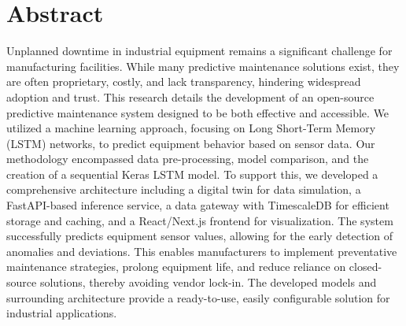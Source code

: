 \chapter{Abstract}
\begin{SingleSpace}
Unplanned downtime in industrial equipment remains a significant challenge for manufacturing facilities. While many predictive maintenance solutions exist, they are often proprietary, costly, and lack transparency, hindering widespread adoption and trust. This research details the development of an open-source predictive maintenance system designed to be both effective and accessible. We utilized a machine learning approach, focusing on Long Short-Term Memory (LSTM) networks, to predict equipment behavior based on sensor data. Our methodology encompassed data pre-processing, model comparison, and the creation of a sequential Keras LSTM model. To support this, we developed a comprehensive architecture including a digital twin for data simulation, a FastAPI-based inference service, a data gateway with TimescaleDB for efficient storage and caching, and a React/Next.js frontend for visualization. The system successfully predicts equipment sensor values, allowing for the early detection of anomalies and deviations. This enables manufacturers to implement preventative maintenance strategies, prolong equipment life, and reduce reliance on closed-source solutions, thereby avoiding vendor lock-in. The developed models and surrounding architecture provide a ready-to-use, easily configurable solution for industrial applications.

\end{SingleSpace}
